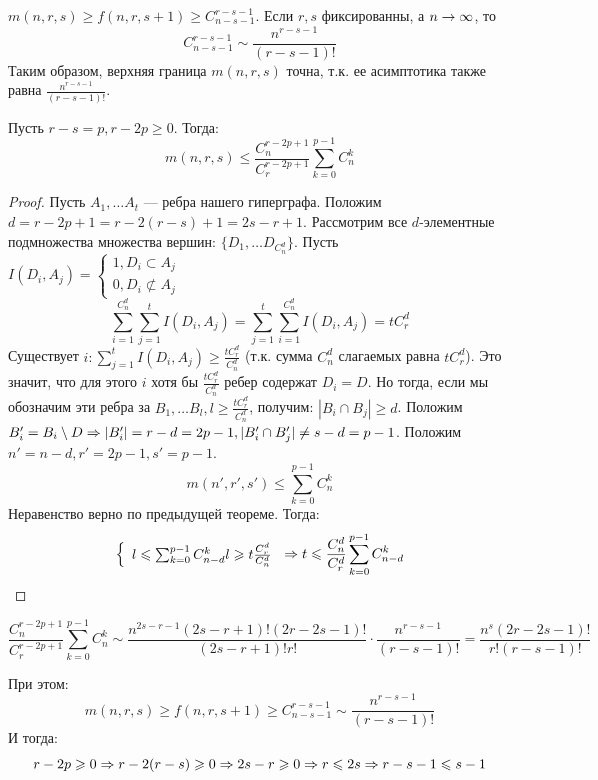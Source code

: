 

\begin{note}
    \(m(n, r, s) \ge f(n, r, s + 1) \ge C_{n - s - 1}^{r - s - 1}\).
    Если \(r, s\) фиксированны, а \(n \rightarrow \infty\), то
    \[C_{n - s - 1}^{r - s - 1} \sim \frac{n^{r - s - 1}}{(r - s - 1)!}\]
    Таким образом, верхняя граница \(m(n, r, s)\) точна, т.к. ее асимптотика также равна \(\frac{n^{r - s - 1}}{(r - s - 1)!}\).
\end{note}

\begin{theorem}
    Пусть \(r - s = p, r - 2p \ge 0\). Тогда:
    \[m(n, r, s) \le \frac{C_n^{r - 2p + 1}}{C_r^{r - 2p + 1}}\sum_{k = 0}^{p - 1}C_n^k\]
\end{theorem}
\begin{proof}
    Пусть \(A_1, \dots A_t\) --- ребра нашего гиперграфа. Положим \(d = r - 2p + 1 = r - 2(r - s) + 1 = 2s - r + 1\). Рассмотрим все \(d\)-элементные подмножества множества вершин: \(\{D_1, \dots D_{C_n^d}\}\). Пусть \(I(D_i, A_j) = \left\{\begin{array}{l}
        1, D_i \subset A_j \\
        0, D_i \not\subset A_j
    \end{array}\right.\)
    \[\sum_{i = 1}^{C_n^d}\sum_{j = 1}^{t}I(D_i, A_j) = \sum_{j = 1}^{t}\sum_{i = 1}^{C_n^d}I(D_i, A_j) = tC_r^d\]
    Существует \(i: \sum_{j = 1}^t I(D_i, A_j) \ge \frac{tC_r^d}{C_n^d}\) (т.к. сумма \(C_n^d\) слагаемых равна \(tC_r^d\)). Это значит, что для этого \(i\) хотя бы \(\frac{tC_r^d}{C_n^d}\) ребер содержат \(D_i = D\). Но тогда, если мы обозначим эти ребра за \(B_1, \dots B_l, l \ge \frac{tC_r^d}{C_n^d}\), получим: \(|B_i \cap B_j| \ge d\). Положим \(B_i' = B_i \setminus D \Rightarrow |B_i'| = r - d = 2p - 1, |B_i' \cap B_j'| \ne s - d = p - 1\). Положим \(n' = n - d, r' = 2p - 1, s' = p - 1\).
    \[m(n', r', s') \le \sum_{k = 0}^{p - 1}C_n^k\]
    Неравенство верно по предыдущей теореме. Тогда:
    \[\left\{\begin{array}{l}
        l \leqslant \sum_{k = 0}^{p - 1}C_{n - d}^k
        l \geqslant t\frac{C_r^d}{C_n^d}
    \end{array}\right. \Rightarrow t \leqslant \frac{C_n^d}{C_r^d}\sum_{k = 0}^{p - 1}C_{n - d}^k\]
\end{proof}

\begin{note}
    \[\frac{C_n^{r - 2p + 1}}{C_r^{r - 2p + 1}}\sum_{k = 0}^{p - 1}C_n^k \sim \frac{n^{2s - r - 1}(2s - r + 1)!(2r - 2s - 1)!}{(2s - r + 1)!r!} \cdot \frac{n^{r - s - 1}}{(r - s - 1)!} = \frac{n^s(2r - 2s - 1)!}{r!(r - s - 1)!}\]

    При этом:
    \[m(n, r, s) \ge f(n, r, s + 1) \ge C_{n - s - 1}^{r - s - 1} \sim \frac{n^{r - s - 1}}{(r - s - 1)!}\]
    И тогда:
    \[r - 2p \geqslant 0 \Rightarrow r - 2(r - s) \geqslant 0 \Rightarrow 2s - r \geqslant 0 \Rightarrow r \leqslant 2s \Rightarrow r - s - 1 \leqslant s - 1\]
\end{note}

